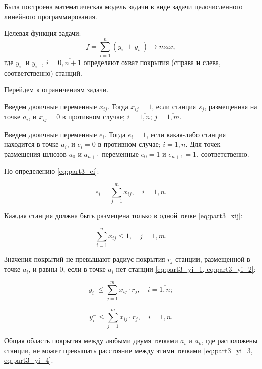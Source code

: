 Была построена математическая модель задачи в виде задачи целочисленного линейного программирования. 

Целевая функция задачи:
\begin{equation}
    \label{eq:part3_objective_function}
    f =  \sum\limits_{i=1}^n (y_i^- + y_i^+) \rightarrow max,
  \end{equation}
где $y_i^+$ и $y_i^-$ , $i= \overline{0,n+1}$ определяют охват покрытия (справа и слева, соответственно) станций.

Перейдем к ограничениям задачи.

Введем двоичные переменные $x_{ij}$. Тогда $x_{ij}=1$, если станция $s_j$, размещенная на точке $a_i$, и $x_{ij}=0$ в противном случае; $i= \overline{1, n}$; $j = \overline{1,m}$.

Введем двоичные переменные $ e_i $. Тогда $ e_i = 1 $, если какая-либо станция находится в точке $ a_i $, и $ e_i = 0$  в противном случае; $ i = \overline {1, n} $. Для точек размещения шлюзов $ a_0 $ и $a_{n + 1}$ переменные $ e_0 = 1 $ и $ e_{n + 1} =1 $, соответственно.

По определению \cref{eq:part3_ei}:

\begin{equation}
  \label{eq:part3_ei}
  e_i =  \sum\limits_{j=1}^m x_{ij}, \quad i = \overline{1,n}. 
\end{equation}

Каждая станция должна быть размещена только в одной точке \cref{eq:part3_xij}:

\begin{equation}
  \label{eq:part3_xij}
  \sum\limits_{i=1}^n x_{ij} \leq 1, \quad j = \overline{1,m}. 
\end{equation}

Значения покрытий не превышают радиус покрытия $r_j$ станции, размещенной в точке $ a_i $, и равны 0, если в точке $a_i$  нет станции \cref{eq:part3_yi_1, eq:part3_yi_2}:

\begin{equation}
  \label{eq:part3_yi_1}
  y_i^+ \leq \sum\limits_{j=1}^m x_{ij} \cdot r_j, \quad i = \overline{1,n};
\end{equation}

\begin{equation}
  \label{eq:part3_yi_2}
  y_i^- \leq \sum\limits_{j=1}^m x_{ij} \cdot r_j, \quad i = \overline{1,n}. 
\end{equation}

Общая область покрытия между любыми двумя точками $ a_i $ и $ a_k $, где расположены станции, не может превышать расстояние между этими точками \cref{eq:part3_yi_3, eq:part3_yi_4}.

